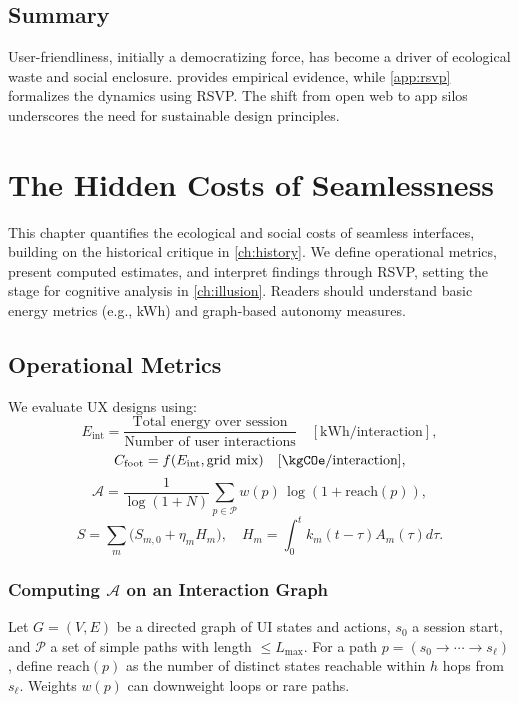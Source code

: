 \documentclass[openany]{book}
\newcommand{\Sent}{S} %
\newcommand{\Eint}{E_{\mathrm{int}}} %
\newcommand{\Cfoot}{C_{\mathrm{foot}}} %
\newcommand{\Auton}{\mathcal{A}} %
\newcommand{\kWh}{\mathrm{kWh}}
\begin{document}
\section{Summary}
User-friendliness, initially a democratizing force, has become a driver of ecological waste and social enclosure.  provides empirical evidence, while \cref{app:rsvp} formalizes the dynamics using RSVP. The shift from open web to app silos underscores the need for sustainable design principles.

\chapter{The Hidden Costs of Seamlessness}
\label{ch:hidden-costs}

This chapter quantifies the ecological and social costs of seamless interfaces, building on the historical critique in \cref{ch:history}. We define operational metrics, present computed estimates, and interpret findings through RSVP, setting the stage for cognitive analysis in \cref{ch:illusion}. Readers should understand basic energy metrics (e.g., kWh) and graph-based autonomy measures.

\section{Operational Metrics}
\label{sec:metrics-def}
We evaluate UX designs using:
\begin{equation}
\Eint = \frac{\text{Total energy over session}}{\text{Number of user interactions}} \quad [\kWh/\text{interaction}],
\end{equation}
\begin{equation}
\Cfoot = f(\Eint, \text{grid mix}) \quad [\kgCOe/\text{interaction}],
\end{equation}
\begin{equation}
\label{eq:autonomy}
\Auton = \frac{1}{\log(1+N)}\sum_{p\in \mathcal{P}} w(p)\,\log(1+\mathrm{reach}(p)),
\end{equation}
\begin{equation}
\Sent = \sum_m \big(S_{m,0} + \eta_m H_m\big), \quad H_m = \int_0^t k_m(t-\tau) A_m(\tau) d\tau.
\end{equation}

\subsection{Computing \texorpdfstring{$\Auton$}{A} on an Interaction Graph}
\label{sec:metrics-autonomy-alg}
Let $G=(V,E)$ be a directed graph of UI states and actions, $s_0$ a session start, and $\mathcal{P}$ a set of simple paths with length $\le L_{\max}$. For a path $p=(s_0\!\to\!\cdots\!\to\!s_\ell)$, define $\mathrm{reach}(p)$ as the number of distinct states reachable within $h$ hops from $s_\ell$. Weights $w(p)$ can downweight loops or rare paths.
\end{document}
